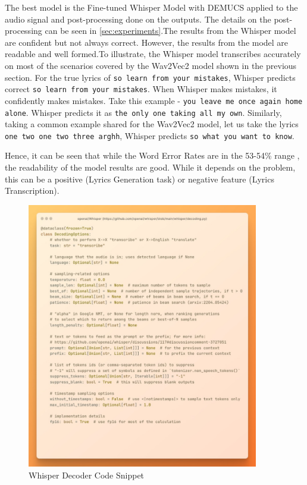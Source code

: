 The best model is the Fine-tuned Whisper Model with DEMUCS applied to the audio signal and post-processing done on the outputs. The details on the post-processing can be seen in \ref{sec:experiments}.The results from the Whisper model are confident but not always correct. However, the results from the model are readable and well formed.To illustrate, the Whisper model transcribes accurately on most of the scenarios covered by the Wav2Vec2 model shown in the previous section. For the true lyrics of \texttt{so learn from your mistakes}, Whisper predicts correct \texttt{so learn from your mistakes}. When Whisper makes mistakes, it confidently makes mistakes. Take this example - \texttt{you leave me once again home alone}. Whisper predicts it as \texttt{the only one taking all my own}. Similarly, taking a common example shared for the Wav2Vec2 model, let us take the lyrics \texttt{one two one two three arghh}, Whisper predicts \texttt{so what you want to know}.

Hence, it can be seen that while the Word Error Rates are in the 53-54\% range , the readability of the model results are good. While it depends on the problem, this can be a positive (Lyrics Generation task) or negative feature (Lyrics Transcription).


\begin{figure}
    \centering
    \includegraphics[width=0.9\textwidth]{05-research study/figures/whisper-decoder-code-snippet.pdf}
    \caption{Whisper Decoder Code Snippet}
    \label{fig:whisper-code-snippet}
\end{figure}


